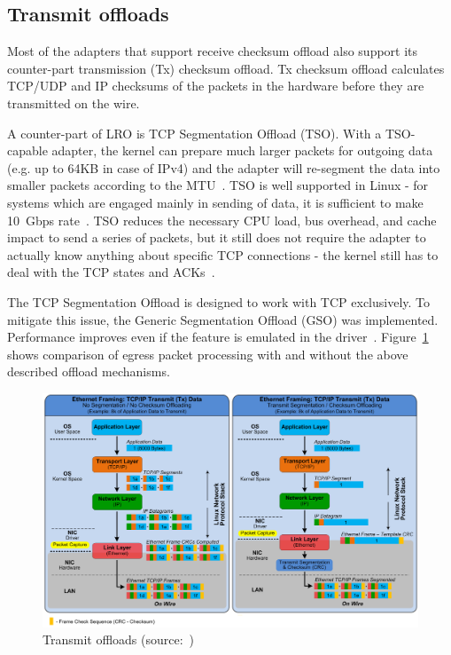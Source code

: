 
\subsection{Transmit offloads}
Most of the adapters that support receive checksum offload
also support its counter-part transmission (Tx) checksum offload.
Tx checksum offload calculates TCP/UDP and
IP checksums of the packets in the hardware before they are transmitted on the wire.

A counter-part of LRO is TCP Segmentation Offload (TSO).
With a TSO-capable adapter, the kernel can prepare much larger packets for outgoing data
(e.g. up to 64KB in case of IPv4) and the adapter will re-segment the data into smaller packets according to the MTU~\cite{jls2009-gro}.
TSO is well supported in Linux -
for systems which are engaged mainly in sending of data,
it is sufficient to make 10~Gbps rate~\cite{jls2009-gro}.
TSO reduces the necessary CPU load, bus overhead, and cache impact to send a series of packets,
but it still does not require the adapter to actually know
anything about specific TCP connections -
the kernel still has to deal with the TCP states and ACKs~\cite{linux-and-tcp-offload-engines}.

The TCP Segmentation Offload is designed to work with TCP exclusively.
To mitigate this issue, the Generic Segmentation Offload (GSO) was implemented.
Performance improves even if the feature is emulated in the driver~\cite{jls2009-gro}.
Figure~\ref{fig:linux-tx-offloads} shows comparison of egress packet processing
with and without the above described offload mechanisms.
\begin{figure}
	\centering
	\includegraphics[width=15cm,keepaspectratio]{fig/tx-offloads.png}
	\caption{Transmit offloads (source:~\cite{nst-offloads})}
	\label{fig:linux-tx-offloads}
	\bigskip
\end{figure}
